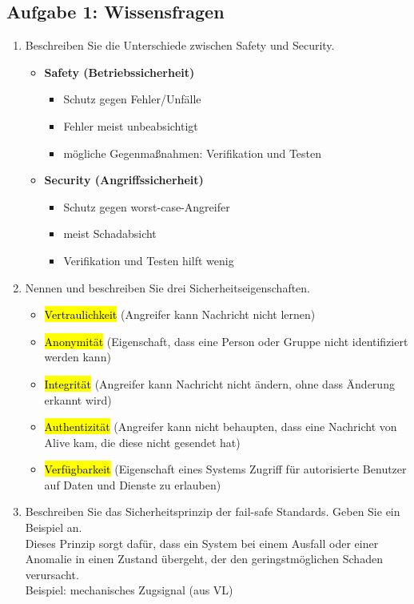 \documentclass[a4paper, 10pt]{article}
\begin{document}
\subsection{Aufgabe 1: Wissensfragen}
\begin{enumerate} [label=(\alph*)]
    \item Beschreiben Sie die Unterschiede zwischen Safety und Security.
    \begin{itemize}
        \item \textbf{Safety (Betriebssicherheit)}
        \begin{itemize}
            \item Schutz gegen Fehler/Unfälle
            \item Fehler meist unbeabsichtigt
            \item mögliche Gegenmaßnahmen: Verifikation und Testen
        \end{itemize}

        \item \textbf{Security (Angriffssicherheit)}
        \begin{itemize}
            \item Schutz gegen worst-case-Angreifer
            \item meist Schadabsicht
            \item Verifikation und Testen hilft wenig
        \end{itemize}
    \end{itemize}

    \item Nennen und beschreiben Sie drei Sicherheitseigenschaften.
    \begin{itemize}
        \item \hl{Vertraulichkeit} (Angreifer kann Nachricht nicht lernen)
        \item \hl{Anonymität} (Eigenschaft, dass eine Person oder Gruppe nicht identifiziert werden kann)
        \item \hl{Integrität} (Angreifer kann Nachricht nicht ändern, ohne dass Änderung erkannt wird)
        \item \hl{Authentizität} (Angreifer kann nicht behaupten, dass eine Nachricht von Alive kam, die diese nicht gesendet hat)
        \item \hl{Verfügbarkeit} (Eigenschaft eines Systems Zugriff für autorisierte Benutzer auf Daten und Dienste zu erlauben)
    \end{itemize}

    \item Beschreiben Sie das Sicherheitsprinzip der fail-safe Standards. Geben Sie ein
    Beispiel an.\\[2mm]
    Dieses Prinzip sorgt dafür, dass ein System bei einem Ausfall oder einer Anomalie in einen Zustand übergeht,
der den geringstmöglichen Schaden verursacht.\\[2mm]
Beispiel: mechanisches Zugsignal (aus VL)


\end{enumerate}
\end{document}
